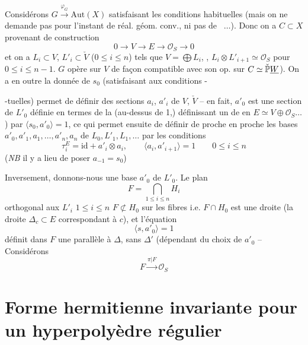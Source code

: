 \documentclass[11pt,a4paper]{article}
\begin{document}

Considérons $G \xrightarrow{\varphi_G} \mathrm{Aut}(X)$ satisfaisant les conditions habituelles (mais on ne demande pas pour l'instant de réal. géom. conv., ni pas de \ill{}~$\dots$). Donc on a $C \subset X$ provenant de construction
\[
0 \to V \to E \to \mathcal{O}_S \to 0
\]
et on a $L_i \subset V$, $L'_i \subset \check{V}$ ($0 \leq i \leq n$)  tels que $V = \bigoplus L_i$, , $L_i \otimes L'_{i+1} \simeq \mathcal{O}_S$ pour $0 \leq i \leq n-1$.   $G$ opère sur $V$ de façon compatible avec son op. sur $C \simeq \check{\mathbb{P}}\uncertain{W}$). On a en outre la donnée de $s_0$ (satisfaisant aux conditions -

-tuelles) permet de définir des sections $a_i$, $a'_i$ de $V$, $\check{V}$ -- en fait, $a'_0$ est une section de $L'_0$ définie en termes de  la   (au-dessus de 1,)  définissant un  de \ill{} en $E \simeq V \oplus \mathcal{O}_S \dots$) par $\langle s_0, a'_0\rangle = 1$, ce qui permet ensuite de définir de proche en proche les bases $a'_0, a'_1, a_1, \dots, a'_n, a_n$ de $L_0, L'_1, L_1, \dots$ par les conditions
\[
\tau_i^{E} = \mathrm{id} + a'_i \otimes a_i, \qquad \langle a_i, a'_{i+1}\rangle = 1 \qquad 0 \leq i \leq n
\]
(\emph{NB} il y a lieu de poser $a_{-1} = s_0$)

Inversement, donnons-nous une base $a'_0$ de $L'_0$.  Le plan
\[
F = \bigcap_{1 \leq i \leq n} H_i
\]
orthogonal aux $L'_i$ $1 \leq i \leq n$  \ill{}  $F \not\subset H_0$ sur les fibres i.e. $F \cap H_0$ est une droite (la droite $\Delta_c \subset E$  correspondant à $c$), et l'équation
\[
\langle s, a'_0\rangle = 1
\]
définit dans $F$ une  \struck{\ill{}} parallèle à $\Delta$, sans $\Delta'$ (dépendant du choix de $a'_0$ -- 
Considérons
\[
F \xrightarrow{\pi | F} \mathcal{O}_S
\]

\section{Forme hermitienne invariante pour un hyperpolyèdre régulier}
\end{document}
